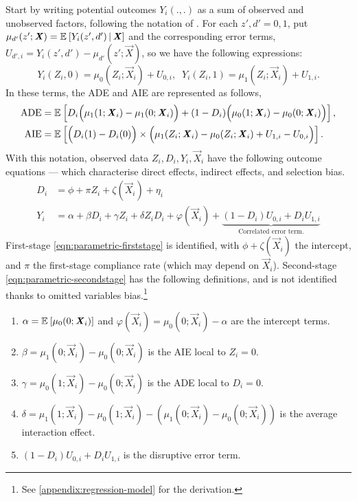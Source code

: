 Start by writing potential outcomes $Y_i(., .)$ as a sum of observed and unobserved factors, following the notation of \cite{heckman2005structural}.
For each $z',d' = 0,1$, put $\mu_{d'}(z'; \boldsymbol{\mathit{X}}) = \mathbb{E}_{} \left[ Y_i(z', d') \, \middle\vert \, \boldsymbol{\mathit{X}} \right]$ and the corresponding error terms, $U_{d', i} = Y_i(z', d') - \mu_{d'}(z'; \vec X)$, so we have the following expressions:
\[ Y_i(Z_i, 0)
        = \mu_{0}(Z_i; \vec X_i) + U_{0,i}, \;\;
    Y_i(Z_i, 1)
        = \mu_{1}(Z_i; \vec X_i) + U_{1,i}. \]
In these terms, the ADE and AIE are represented as follows,
\begin{align*}
    \text{ADE}
    &= \mathbb{E}_{} \left[  D_i \Big( \mu_{1}(1; \boldsymbol{\mathit{X}}_i) - \mu_{1}(0; \boldsymbol{\mathit{X}}_i)\Big)
        + (1 - D_i) \Big( \mu_{0}(1; \boldsymbol{\mathit{X}}_i) - \mu_{0}(0; \boldsymbol{\mathit{X}}_i)\Big) \right], \\
    \text{AIE}
        &= \mathbb{E}_{} \left[ \Big( D_i(1) - D_i(0) \Big)
        \times \Big( \mu_1(Z_i; \boldsymbol{\mathit{X}}_i) - \mu_0(Z_i; \boldsymbol{\mathit{X}}_i) + U_{1,i} - U_{0,i}\Big)  \right].
\end{align*}
With this notation, observed data $Z_i, D_i, Y_i, \vec X_i$ have the following outcome equations --- which characterise direct effects, indirect effects, and selection bias.
\begin{align}
    \label{eqn:parametric-firststage}
    D_i &= \phi + \pi Z_i + \zeta(\vec X_i) + \eta_i  \\
    \label{eqn:parametric-secondstage}
    Y_i &= \alpha + \beta D_i + \gamma Z_i + \delta Z_i D_i
    + \varphi(\vec X_i)
    + \underbrace{\left(1 - D_i \right)U_{0,i} + D_i U_{1,i}}_{
        \text{Correlated error term.}}
\end{align}
First-stage \eqref{eqn:parametric-firststage} is identified, with $\phi + \zeta(\vec X_i)$ the intercept, and $\pi$ the first-stage compliance rate (which may depend on $\vec X_i$).
Second-stage \eqref{eqn:parametric-secondstage} has the following definitions, and is not identified thanks to omitted variables bias.\footnote{
    See \autoref{appendix:regression-model} for the derivation.
}
\begin{enumerate}[label=\textbf{(\alph*)}]
    \item $\alpha = \mathbb{E}_{} \left[ \mu_0(0; \boldsymbol{\mathit{X}}_i) \right]$ and $\varphi(\vec X_i) = \mu_0(0; \vec X_i) - \alpha$ are the intercept terms.
    \item $\beta = \mu_1(0; \vec X_i) - \mu_0(0; \vec X_i)$ is the AIE local to $Z_i = 0$.
    \item $\gamma = \mu_0(1; \vec X_i) - \mu_0(0; \vec X_i)$ is the ADE local to $D_i = 0$.
    \item $\delta = \mu_1(1; \vec X_i) - \mu_0(1; \vec X_i)- \left( \mu_1(0; \vec X_i) - \mu_0(0; \vec X_i) \right)$ is the average interaction effect.
    \item $\left( 1 - D_i \right) U_{0,i} + D_i U_{1,i}$ is the disruptive error term.
\end{enumerate}

